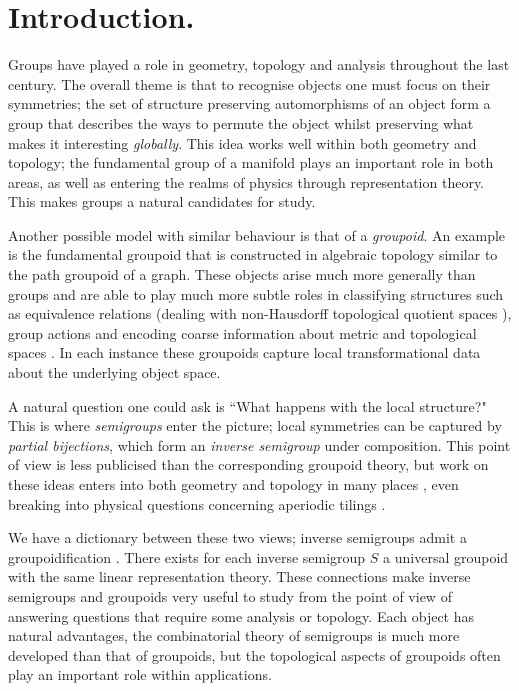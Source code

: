 \chapter{Introduction.}

Groups have played a role in geometry, topology and analysis throughout the last century. The overall theme is that to recognise objects one must focus on their symmetries; the set of structure preserving automorphisms of an object form a group that describes the ways to permute the object whilst preserving what makes it interesting \textit{globally}. This idea works well within both geometry and topology; the fundamental group of a manifold plays an important role in both areas, as well as entering the realms of physics through representation theory. This makes groups a natural candidates for study.

Another possible model with similar behaviour is that of a \textit{groupoid}. An example is the fundamental groupoid that is constructed in algebraic topology similar to the path groupoid of a graph. These objects arise much more generally than groups and are able to play much more subtle roles in classifying structures such as equivalence relations (dealing with non-Hausdorff topological quotient spaces \cite{MR1826266}), group actions and encoding coarse information about metric and topological spaces \cite{MR1905840}. In each instance these groupoids capture local transformational data about the underlying object space.

A natural question one could ask is ``What happens with the local structure?" This is where \textit{semigroups} enter the picture; local symmetries can be captured by \textit{partial bijections}, which form an \textit{inverse semigroup} under composition. This point of view is less publicised than the corresponding groupoid theory, but work on these ideas enters into both geometry and topology in many places \cite{MR0160848,MR1694900,MR1798993}, even breaking into physical questions concerning aperiodic tilings \cite{MR1798993,MR2041539}.

We have a dictionary between these two views; inverse semigroups admit a groupoidification \cite{MR1724106,MR2419901}. There exists for each inverse semigroup $S$ a universal groupoid with the same linear representation theory. These connections make inverse semigroups and groupoids very useful to study from the point of view of answering questions that require some analysis or topology. Each object has natural advantages, the combinatorial theory of semigroups is much more developed than that of groupoids, but the topological aspects of groupoids often play an important role within applications.

